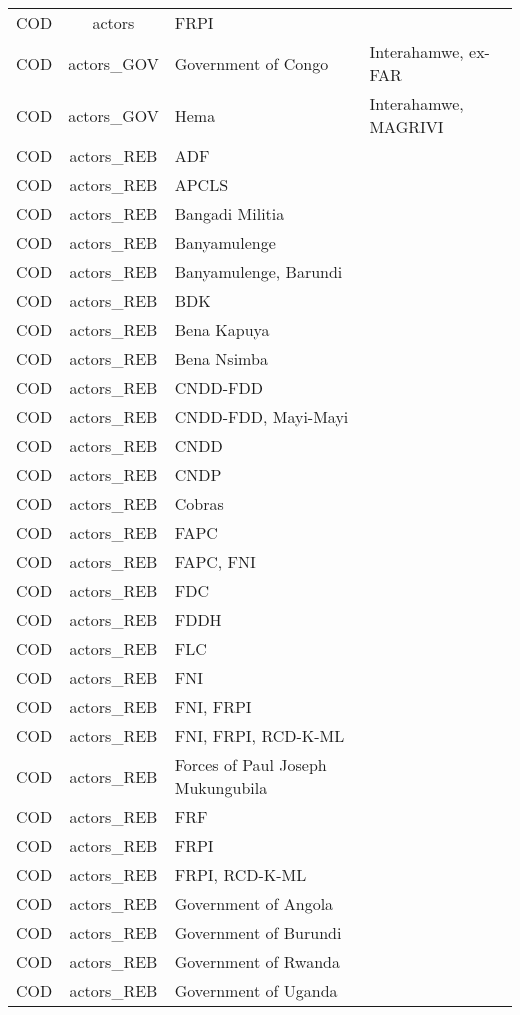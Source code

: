 \documentclass[12pt]{article}
\begin{document}
\begin{center}
\begin{longtable}{|c|c|p{7cm}|p{7cm}|}
  COD & actors & FRPI &  \\ 
  COD & actors\_GOV & Government of Congo & Interahamwe, ex-FAR \\ 
  COD & actors\_GOV & Hema & Interahamwe, MAGRIVI \\ 
  COD & actors\_REB & ADF &  \\ 
  COD & actors\_REB & APCLS &  \\ 
  COD & actors\_REB & Bangadi Militia &  \\ 
  COD & actors\_REB & Banyamulenge &  \\ 
  COD & actors\_REB & Banyamulenge, Barundi &  \\ 
  COD & actors\_REB & BDK &  \\ 
  COD & actors\_REB & Bena Kapuya &  \\ 
  COD & actors\_REB & Bena Nsimba &  \\ 
  COD & actors\_REB & CNDD-FDD &  \\ 
  COD & actors\_REB & CNDD-FDD, Mayi-Mayi &  \\ 
  COD & actors\_REB & CNDD &  \\ 
  COD & actors\_REB & CNDP &  \\ 
  COD & actors\_REB & Cobras &  \\ 
  COD & actors\_REB & FAPC &  \\ 
  COD & actors\_REB & FAPC, FNI &  \\ 
  COD & actors\_REB & FDC &  \\ 
  COD & actors\_REB & FDDH &  \\ 
  COD & actors\_REB & FLC &  \\ 
  COD & actors\_REB & FNI &  \\ 
  COD & actors\_REB & FNI, FRPI &  \\ 
  COD & actors\_REB & FNI, FRPI, RCD-K-ML &  \\ 
  COD & actors\_REB & Forces of Paul Joseph Mukungubila &  \\ 
  COD & actors\_REB & FRF &  \\ 
  COD & actors\_REB & FRPI &  \\ 
  COD & actors\_REB & FRPI, RCD-K-ML &  \\ 
  COD & actors\_REB & Government of Angola &  \\ 
  COD & actors\_REB & Government of Burundi &  \\ 
  COD & actors\_REB & Government of Rwanda &  \\ 
  COD & actors\_REB & Government of Uganda &  \\ 

\end{longtable}
\end{center}
\end{document}
